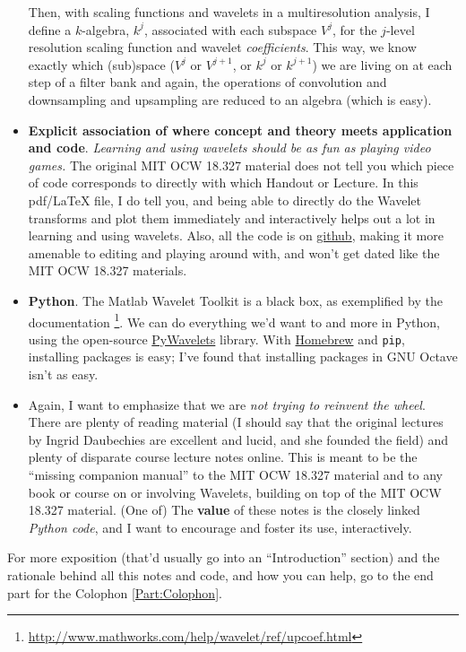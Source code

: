 \documentclass[twoside]{amsart}
\theoremstyle{plain}
\theoremstyle{definition}
\theoremstyle{remark}
\numberwithin{equation}{section}
\begin{document}
\begin{itemize}
Then, with scaling functions and wavelets in a multiresolution analysis, I define a $k$-algebra, $k^j$, associated with each subspace $V^j$, for the $j$-level resolution scaling function and wavelet \emph{coefficients}.  This way, we know exactly which (sub)space ($V^j$ or $V^{j+1}$, or $k^j$ or $k^{j+1}$) we are living on at each step of a filter bank and again, the operations of convolution and downsampling and upsampling are reduced to an algebra (which is easy).  
\item \textbf{Explicit association of where concept and theory meets application and code}.  \emph{Learning and using wavelets should be as fun as playing video games.}  The original MIT OCW 18.327 material does not tell you which piece of code corresponds to directly with which Handout or Lecture.  In this pdf/LaTeX file, I do tell you, and being able to directly do the Wavelet transforms and plot them immediately and interactively helps out a lot in learning and using wavelets.  Also, all the code is on \href{https://github.com/ernestyalumni/18-327-wavelets-filter-banks}{github}, making it more amenable to editing and playing around with, and won't get dated like the MIT OCW 18.327 materials.
\item \textbf{Python}. The Matlab Wavelet Toolkit is a black box, as exemplified by the documentation \footnote{\url{http://www.mathworks.com/help/wavelet/ref/upcoef.html}}.  We can do everything we'd want to and more in Python, using the open-source \href{http://www.pybytes.com/pywavelets/}{PyWavelets} library. With \href{http://brew.sh}{Homebrew} and \verb|pip|, installing packages is easy; I've found that installing packages in GNU Octave isn't as easy.  
\item Again, I want to emphasize that we are \emph{not trying to reinvent the wheel}.  There are plenty of reading material (I should say that the original lectures by Ingrid Daubechies \cite{IDaubechies1992} are excellent and lucid, and she founded the field) and plenty of disparate course lecture notes online.   This is meant to be the ``missing companion manual'' to the MIT OCW 18.327 material and to any book or course on or involving Wavelets, building on top of the MIT OCW 18.327 material.   (One of) The \textbf{value} of these notes is the closely linked \emph{Python code}, and I want to encourage and foster its use, interactively.    
\end{itemize}

For more exposition (that'd usually go into an ``Introduction'' section) and the rationale behind all this notes and code, and how you can help, go to the end part for the Colophon \ref{Part:Colophon}.  
\end{document}
